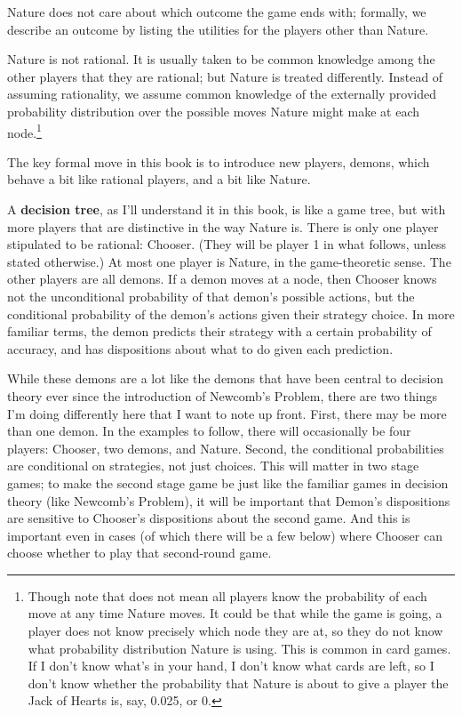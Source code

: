 \documentclass[
  12pt,
  letterpaper,
  DIV=11,
  numbers=noendperiod]{scrreprt}
\begin{document}
Nature does not care about which outcome the game ends with; formally,
we describe an outcome by listing the utilities for the players other
than Nature.

Nature is not rational. It is usually taken to be common knowledge among
the other players that they are rational; but Nature is treated
differently. Instead of assuming rationality, we assume common knowledge
of the externally provided probability distribution over the possible
moves Nature might make at each node.\footnote{Though note that does not
  mean all players know the probability of each move at any time Nature
  moves. It could be that while the game is going, a player does not
  know precisely which node they are at, so they do not know what
  probability distribution Nature is using. This is common in card
  games. If I don't know what's in your hand, I don't know what cards
  are left, so I don't know whether the probability that Nature is about
  to give a player the Jack of Hearts is, say, 0.025, or 0.}

The key formal move in this book is to introduce new players, demons,
which behave a bit like rational players, and a bit like Nature.

A \textbf{decision tree}, as I'll understand it in this book, is like a
game tree, but with more players that are distinctive in the way Nature
is. There is only one player stipulated to be rational: Chooser. (They
will be player 1 in what follows, unless stated otherwise.) At most one
player is Nature, in the game-theoretic sense. The other players are all
demons. If a demon moves at a node, then Chooser knows not the
unconditional probability of that demon's possible actions, but the
conditional probability of the demon's actions given their strategy
choice. In more familiar terms, the demon predicts their strategy with a
certain probability of accuracy, and has dispositions about what to do
given each prediction.

While these demons are a lot like the demons that have been central to
decision theory ever since the introduction of Newcomb's Problem, there
are two things I'm doing differently here that I want to note up front.
First, there may be more than one demon. In the examples to follow,
there will occasionally be four players: Chooser, two demons, and
Nature. Second, the conditional probabilities are conditional on
strategies, not just choices. This will matter in two stage games; to
make the second stage game be just like the familiar games in decision
theory (like Newcomb's Problem), it will be important that Demon's
dispositions are sensitive to Chooser's dispositions about the second
game. And this is important even in cases (of which there will be a few
below) where Chooser can choose whether to play that second-round game.
\end{document}
